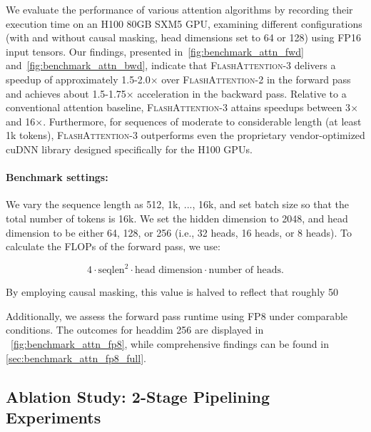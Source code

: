 \begin{enumerate}
We evaluate the performance of various attention algorithms by recording their execution time on an H100 80GB SXM5 GPU, examining different configurations (with and without causal masking, head dimensions set to 64 or 128) using FP16 input tensors. Our findings, presented in~\cref{fig:benchmark_attn_fwd} and~\cref{fig:benchmark_attn_bwd}, indicate that \textsc{FlashAttention-3} delivers a speedup of approximately 1.5-2.0$\times$ over \textsc{FlashAttention-2} in the forward pass and achieves about 1.5-1.75$\times$ acceleration in the backward pass. Relative to a conventional attention baseline, \textsc{FlashAttention-3} attains speedups between 3$\times$ and 16$\times$. Furthermore, for sequences of moderate to considerable length (at least 1k tokens), \textsc{FlashAttention-3} outperforms even the proprietary vendor-optimized cuDNN library designed specifically for the H100 GPUs.

\paragraph{Benchmark settings:} We vary the sequence length as 512, 1k, ..., 16k, and set batch size so that the total number of tokens is 16k. We set the hidden dimension to 2048, and head dimension to be either 64, 128, or 256 (i.e., 32 heads, 16 heads, or 8 heads). To calculate the FLOPs of the forward pass, we use:

\begin{equation*}
  4 \cdot \text{seqlen}^2 \cdot \text{head dimension} \cdot \text{number of heads}.
\end{equation*}

By employing causal masking, this value is halved to reflect that roughly 50%

Additionally, we assess the forward pass runtime using FP8 under comparable conditions. The outcomes for headdim 256 are displayed in ~\cref{fig:benchmark_attn_fp8}, while comprehensive findings can be found in \cref{sec:benchmark_attn_fp8_full}.

\subsection{Ablation Study: 2-Stage Pipelining Experiments}
\label{sec:2-stage-pipelining-experiments}


\end{enumerate}
